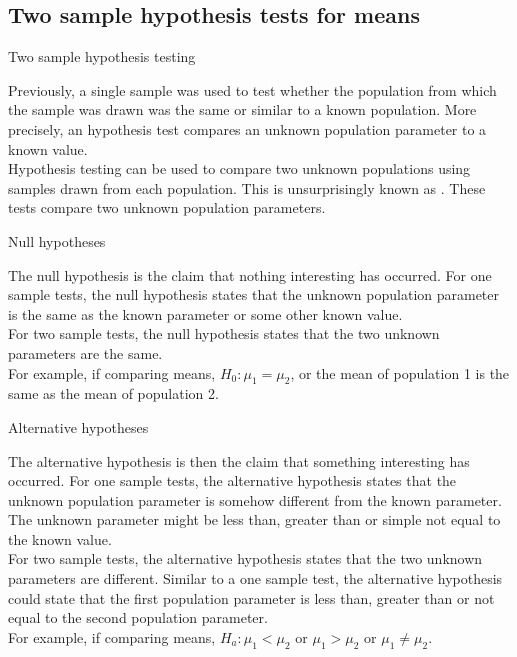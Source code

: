 \documentclass[xcolor=table, aspectratio=169, bigger, handout]{beamer}
\begin{document}
%
%
\subsection{Two sample hypothesis tests for means}

\begin{frame}{Two sample hypothesis testing}
\begin{block}{}
Previously, a single sample was used to test whether the population from which the sample was drawn was the same or similar to a known population. More precisely, an hypothesis test compares an unknown population parameter to a known value.\\
\pause\medskip
Hypothesis testing can be used to compare two unknown populations using samples drawn from each population. This is unsurprisingly known as . These tests compare two unknown population parameters.
\end{block}
\end{frame}

\begin{frame}{Null hypotheses}
\begin{block}{}
The null hypothesis is the claim that nothing interesting has occurred. For one sample tests, the null hypothesis states that the unknown population parameter is the same as the known parameter or some other known value.\\
\medskip
\pause For two sample tests, the null hypothesis states that the two unknown parameters are the same.\\
\medskip
\pause For example, if comparing means, $H_0: \mu_1 = \mu_2$, or the mean of population 1 is the same as the mean of population 2.
\end{block}
\end{frame}

\begin{frame}{Alternative hypotheses}
\begin{block}{}
The alternative hypothesis is then the claim that something interesting has occurred. For one sample tests, the alternative hypothesis states that the unknown population parameter is somehow different from the known parameter. The unknown parameter might be less than, greater than or simple not equal to the known value. \\
\pause\medskip
For two sample tests, the alternative hypothesis states that the two unknown parameters are different. Similar to a one sample test, the alternative hypothesis could state that the first population parameter is less than, greater than or not equal to the second population parameter.\\
\pause\medskip
For example, if comparing means, $H_a: \mu_1 < \mu_2$ or $\mu_1 > \mu_2$ or $\mu_1 \ne \mu_2$.
\end{block}
\end{frame}
\end{document}
